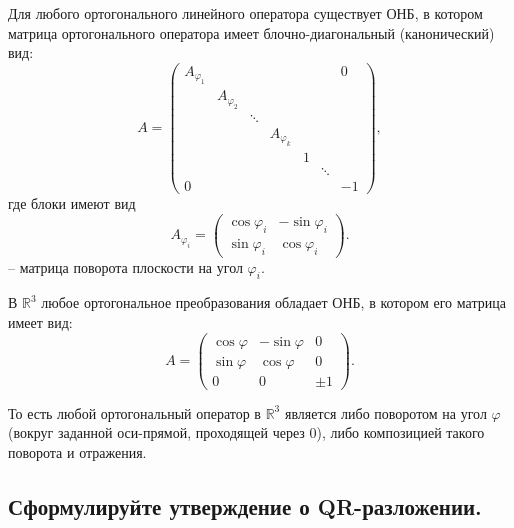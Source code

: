 \begin{theorem}
    Для любого ортогонального линейного оператора существует ОНБ, в котором матрица ортогонального оператора имеет блочно-диагональный (канонический) вид:
    \[
    A =
    \begin{pmatrix}
        A_{\varphi_1} &        &        &        &        &        & 0 \\
                      & A_{\varphi_2} &        &        &        &        &   \\
                      &        & \ddots &        &        &        &   \\
                      &        &        & A_{\varphi_k} &        &        &   \\
                      &        &        &        & 1      &        &   \\
                      &        &        &        &        & \ddots &   \\
        0             &        &        &        &        &        & -1
    \end{pmatrix},
\]
    где блоки имеют вид
    \[
        A_{\varphi_i}
        =
        \begin{pmatrix}
            \cos \varphi_i & -\sin \varphi_i \\
            \sin \varphi_i & \cos \varphi_i
        \end{pmatrix}.
    \]
    -- матрица поворота плоскости на угол $\varphi_i$.
\end{theorem}
\begin{theorem}
    В $\mathbb{R}^3$ любое ортогональное преобразования обладает ОНБ, в котором его матрица имеет вид:
    \[
        A =
        \begin{pmatrix}
            \cos \varphi & -\sin \varphi & 0 \\
            \sin \varphi & \cos \varphi & 0 \\
            0 & 0 & \pm 1
        \end{pmatrix}.
    \]
\end{theorem}

\begin{remark}
    То есть любой ортогональный оператор в $\mathbb{R}^3$ является либо поворотом на угол $\varphi$
    (вокруг заданной оси-прямой, проходящей через $0$), либо композицией такого поворота и отражения.
\end{remark}


\subsection{Сформулируйте утверждение о QR-разложении.}


